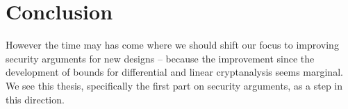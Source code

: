 \chapter{Conclusion}\label{ch:conclusion}


However the time may has come where we should shift our focus to improving security arguments for new designs -- because the improvement since the development of bounds for differential and linear cryptanalysis seems marginal.
We see this thesis, specifically the first part on security arguments, as a step in this direction.
